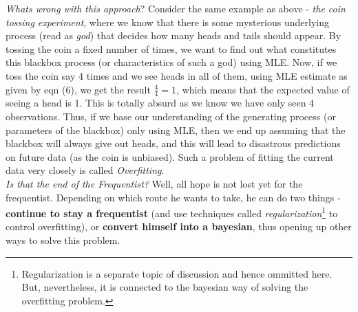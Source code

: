 \documentclass[a4paper]{article}
\begin{document}
\noindent \textit{Whats wrong with this approach}? Consider the same example as above - \textit{the coin tossing experiment}, where we know that there is some mysterious underlying process (read as \textit{god}) that decides how many heads and tails should appear. By tossing the coin a fixed number of times, we want to find out what constitutes this blackbox process (or characteristics of such a god) using MLE. Now, if we toss the coin say 4 times and we see heads in all of them, using MLE estimate as given by eqn (6), we get the result $\frac{4}{4} = 1$, which means that the expected value of seeing a head is 1. This is totally absurd as we know we have only seen 4 observations. Thus, if we base our understanding of the generating process (or parameters of the blackbox) only using MLE, then we end up assuming that the blackbox will always give out heads, and this will lead to disastrous predictions on future data (as the coin is unbiased). Such a problem of fitting the current data very closely is called \textit{Overfitting}. \\

\noindent \textit{Is that the end of the Frequentist?} Well, all hope is not lost yet for the frequentist. Depending on which route he wants to take, he can do two things - \textbf{continue to stay a frequentist} (and use techniques called \textit{regularization}\footnote{Regularization is a separate topic of discussion and hence ommitted here. But, nevertheless, it is connected to the bayesian way of solving the overfitting problem.} to control overfitting), or \textbf{convert himself into a bayesian}, thus opening up other ways to solve this problem. \\



\end{document}
